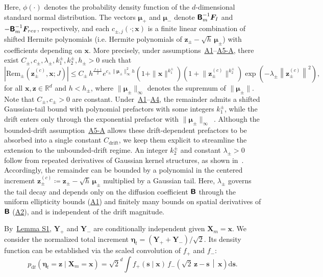 Here, $\phi(\cdot)$ denotes the probability density function of the $d$-dimensional standard normal distribution. The vectors $\bm\mu_+$ and $\bm\mu_-$ denote $\boldsymbol{\mathsf{B}}_m^{-1}\bm F_I$ and $-\boldsymbol{\mathsf{B}}_m^{-1}\bm F_{rev}$, respectively, and each $c_{\pm,j}(\cdot;\bm x)$ is a finite linear combination of shifted Hermite polynomials (i.e. Hermite polynomials of $\bm z_\pm-\sqrt h\,\bm\mu_\pm$) with coefficients depending on $\bm x$.
More precisely, under assumptions~\hyperlink{assumption:A1}{A1}--\hyperlink{assumption:A5-A}{A5-A}, there exist $C_\pm,c_\pm,\lambda_\pm,k^\pm_1,k^\pm_2,h_\pm>0$ such that
\begin{equation}
    \left|\mathrm{Rem}_\pm\!\!\left(\bm z_{\pm}^{(c)},\bm x;J\right)\right|
    \leq
    C_\pm\,h^{\frac{J+1}{2}}
    e^{c_\pm\|\bm\mu_\pm\|_\infty^2 h}
    \!\left(1+\|\bm x\|^{k^\pm_1}\right)
    \!\left(1+\big\|\bm z_{\pm}^{(c)}\big\|^{k^\pm_2}\right)
    \exp\!\left(-\lambda_\pm\!\left\|\bm z_{\pm}^{(c)}\right\|^2\right),
    \label{seq:f_remainder_bound}
\end{equation}
for all $\bm x,\bm z\in\mathbb R^d$ and $h<h_\pm$, where $\|\bm\mu_\pm\|_\infty$ denotes the supremum of $\|\bm\mu_\pm\|$.
Note that $C_\pm,c_\pm>0$ are constant. Under~\hyperlink{assumption:A1}{A1}--\hyperlink{assumption:A4}{A4}, the remainder admits a shifted Gaussian-tail bound with polynomial prefactors with some integers $k_1^\pm$, while the drift enters only through the exponential prefactor with $\|\bm\mu_\pm\|_\infty$~\cite{higa2013estimates,bally2015probabilistic}. 
Although the bounded-drift assumption~\hyperlink{assumption:A5-A}{A5-A} allows these drift-dependent prefactors to be absorbed into a single constant $C_{\mathrm{drift}}$, we keep them explicit to streamline the extension to the unbounded-drift regime.
An integer $k^\pm_2$ and constant $\lambda_\pm>0$ follow from repeated derivatives of Gaussian kernel structures, as shown in~\cite{yang2019anew,bally2015probabilistic}.
Accordingly, the remainder can be bounded by a polynomial in the centered increment $\bm z_\pm^{(c)}\coloneq\bm z_\pm-\sqrt h\,\bm\mu_\pm$ multiplied by a Gaussian tail.
Here, $\lambda_\pm$ governs the tail decay and depends only on the diffusion coefficient $\boldsymbol{\mathsf{B}}$ through the uniform ellipticity bounds (\hyperlink{assumption:A1}{A1}) and finitely many bounds on spatial derivatives of $\boldsymbol{\mathsf{B}}$ (\hyperlink{assumption:A2}{A2}), and is independent of the drift magnitude.

By~\hyperlink{lem:S1}{Lemma S1}, $\bm Y_+$ and $\bm Y_-$ are conditionally independent given $\bm{X}_m=\bm{x}$. We consider the normalized total increment $\bm\eta_t=(\bm Y_+ + \bm Y_-)/\sqrt{2}$.
Its density function can be established via the scaled convolution of $f_+$ and $f_-$: 
\begin{equation*}
    p_{\mathrm dt}(\bm\eta_t=\bm z \mid \bm X_m=\bm x)
    = \sqrt 2^d\!\!\int f_+(\bm s \mid \bm x)\, 
    f_-\!\!\left(\sqrt{2}\,\bm z - \bm s\,\middle|\, \bm x\right)\mathrm d\bm s.
\end{equation*}

